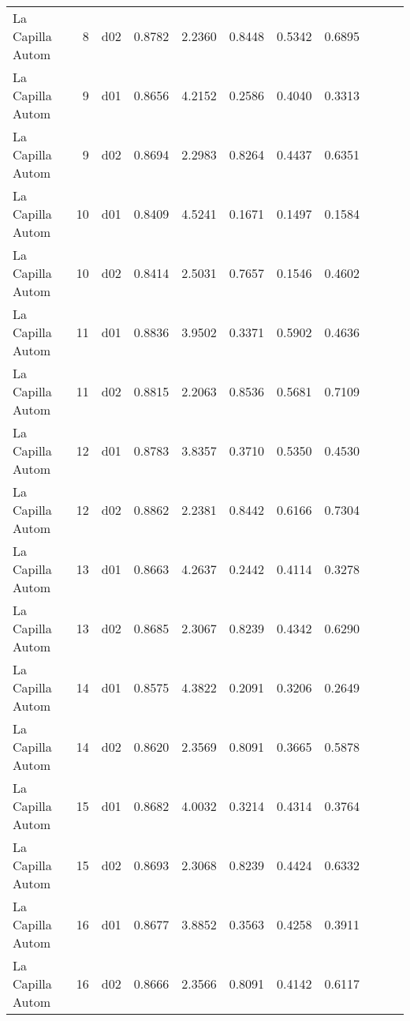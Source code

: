 \begin{landscape}
\begin{longtable}{p{2cm}rrrrrrrrrr}
        La Capilla Autom  &          8 &     d02 &   0.8782 &  2.2360 &        0.8448 &           0.5342 &  0.6895 \\
        La Capilla Autom  &          9 &     d01 &   0.8656 &  4.2152 &        0.2586 &           0.4040 &  0.3313 \\
        La Capilla Autom  &          9 &     d02 &   0.8694 &  2.2983 &        0.8264 &           0.4437 &  0.6351 \\
        La Capilla Autom  &         10 &     d01 &   0.8409 &  4.5241 &        0.1671 &           0.1497 &  0.1584 \\
        La Capilla Autom  &         10 &     d02 &   0.8414 &  2.5031 &        0.7657 &           0.1546 &  0.4602 \\
        La Capilla Autom  &         11 &     d01 &   0.8836 &  3.9502 &        0.3371 &           0.5902 &  0.4636 \\
        La Capilla Autom  &         11 &     d02 &   0.8815 &  2.2063 &        0.8536 &           0.5681 &  0.7109 \\
        La Capilla Autom  &         12 &     d01 &   0.8783 &  3.8357 &        0.3710 &           0.5350 &  0.4530 \\
        La Capilla Autom  &         12 &     d02 &   0.8862 &  2.2381 &        0.8442 &           0.6166 &  0.7304 \\
        La Capilla Autom  &         13 &     d01 &   0.8663 &  4.2637 &        0.2442 &           0.4114 &  0.3278 \\
        La Capilla Autom  &         13 &     d02 &   0.8685 &  2.3067 &        0.8239 &           0.4342 &  0.6290 \\
        La Capilla Autom  &         14 &     d01 &   0.8575 &  4.3822 &        0.2091 &           0.3206 &  0.2649 \\
        La Capilla Autom  &         14 &     d02 &   0.8620 &  2.3569 &        0.8091 &           0.3665 &  0.5878 \\
        La Capilla Autom  &         15 &     d01 &   0.8682 &  4.0032 &        0.3214 &           0.4314 &  0.3764 \\
        La Capilla Autom  &         15 &     d02 &   0.8693 &  2.3068 &        0.8239 &           0.4424 &  0.6332 \\
        La Capilla Autom  &         16 &     d01 &   0.8677 &  3.8852 &        0.3563 &           0.4258 &  0.3911 \\
        La Capilla Autom  &         16 &     d02 &   0.8666 &  2.3566 &        0.8091 &           0.4142 &  0.6117 \\

\end{longtable}
\end{landscape}
